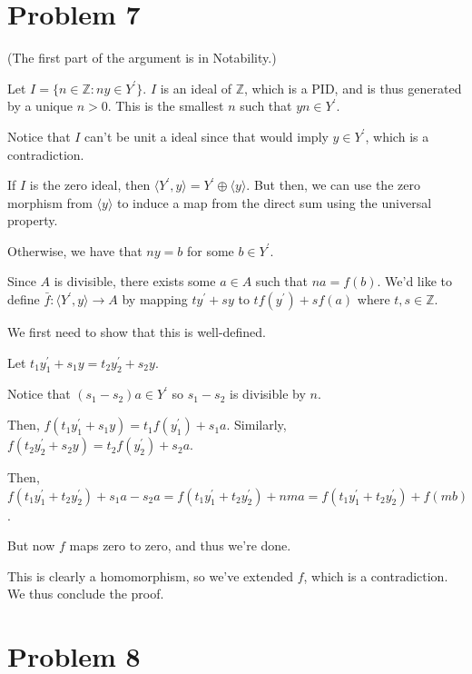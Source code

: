 \documentclass{article}
\theoremstyle{definition}
\begin{document}
\section{Problem 7}

(The first part of the argument is in Notability.)

Let $ I = \{ n \in \mathbb{Z} : ny \in Y^{\prime} \} $. $ I $ is an ideal of $ \mathbb{Z} $,
which is a PID, and is thus generated by a unique $ n > 0 $. This is the smallest $ n $ such that
$ yn \in Y^{\prime} $.

Notice that $ I $ can't be unit a ideal since that would imply $ y \in Y^{\prime} $, which is a contradiction.

If $ I $ is the zero ideal, then $ \langle Y^{\prime}, y \rangle = Y^{\prime} \oplus \langle y \rangle $.
But then, we can use the zero morphism from $ \langle y \rangle $ to induce a map from the direct sum using
the universal property.

Otherwise, we have that $ ny = b $ for some $ b \in Y^{\prime} $.

Since $ A $ is divisible, there exists some $ a \in A $ such that $ na = f(b) $.
We'd like to define $ \bar{f} :  \langle Y^{\prime}, y \rangle \to A $ by mapping
$ t y^{\prime} + sy $ to $ t f(y^{\prime}) + s f(a) $ where $ t,s \in \mathbb{Z} $.

We first need to show that this is well-defined.

Let $ t_{1} y^{\prime}_{1} + s_{1}y = t_{2} y^{\prime}_{2} + s_{2}y $.

Notice that $ (s_{1} - s_{2})a \in Y^{\prime} $ so $ s_{1} - s_{2} $ is divisible by $ n $.

Then, $ f(t_{1} y^{\prime}_{1} + s_{1}y) = t_{1} f(y^{\prime}_{1}) + s_{1}a $.
Similarly, $ f(t_{2} y^{\prime}_{2} + s_{2}y) = t_{2} f(y^{\prime}_{2}) + s_{2}a $.

Then, $ f(t_{1} y^{\prime}_{1} + t_{2} y^{\prime}_{2}) + s_{1}a - s_{2}a = f(t_{1} y^{\prime}_{1} + t_{2} y^{\prime}_{2}) + nma = f(t_{1} y^{\prime}_{1} + t_{2} y^{\prime}_{2}) + f(mb) $.

But now $ f $ maps zero to zero, and thus we're done.

This is clearly a homomorphism, so we've extended $ f $, which is a contradiction. We thus conclude the proof.

\section{Problem 8}
\end{document}
